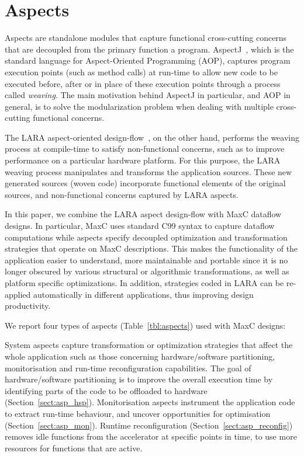 \section{Aspects}
\label{sec:aspects}

Aspects are standalone modules that capture functional cross-cutting concerns
that are decoupled from the primary function a program. AspectJ~\cite{Kiczales:2001}, which is the standard language for Aspect-Oriented Programming (AOP),  captures program execution points (such as method calls) at run-time to allow new code to be executed before, after or in place of these execution points through a process called \emph{weaving}. The main motivation behind AspectJ in particular, and AOP in general, is to solve the modularization problem when dealing with multiple cross-cutting functional concerns.

The LARA aspect-oriented design-flow~\cite{Cardoso:Carvalho:Cutinho:Luk:Nobre:Diniz:Petrov:2012}, on the other hand, performs the weaving process at compile-time to satisfy non-functional concerns, such as to improve performance on a particular hardware platform. For this purpose, the LARA weaving process manipulates and transforms the application sources. These new generated sources (woven code) incorporate functional elements of the original sources, and non-functional concerns captured by LARA aspects.

In this paper, we combine the LARA aspect design-flow with MaxC dataflow designs. In particular, MaxC uses standard C99 syntax to capture dataflow computations while aspects specify decoupled optimization and transformation strategies that operate on MaxC descriptions. This makes the
functionality of the application easier to understand, more
maintainable and portable since it is no longer obscured by various
structural or algorithmic transformations, as well as platform specific
optimizations. In addition, strategies coded in LARA can be re-applied automatically in different applications, thus improving design productivity.

We report four types of aspects (Table~\ref{tbl:aspects}) used with MaxC designs:

\vspace*{0.5ex}
 System aspects capture transformation or optimization strategies that affect the whole application such as those concerning
hardware/software partitioning, monitorisation and run-time reconfiguration
capabilities. The goal of hardware/software partitioning is to improve the overall
execution time by identifying parts of the code to be offloaded to hardware (Section~\ref{sect:asp_hsp}). Monitorisation aspects instrument the application code to extract run-time behaviour, and uncover opportunities for optimisation (Section~\ref{sect:asp_mon}). Runtime reconfiguration (Section~\ref{sect:asp_reconfig}) removes idle functions from the accelerator at specific points in time, to use more resources for functions that are active.

